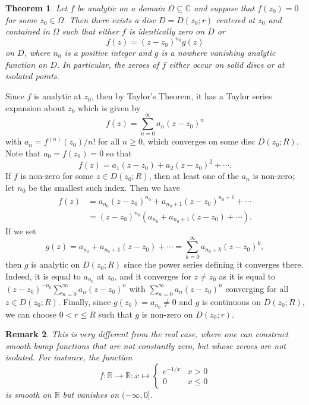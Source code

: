 \documentclass[10pt]{article}
\makeatletter
\newcommand{\R}{\mathbb{R}}
\newcommand{\C}{\mathbb{C}}
\theoremstyle{newstyle}
\newtheorem{thm}{Theorem}[section]
\newtheorem{remark}[thm]{Remark}
\newenvironment{pf}[1][\proofname]{\par
  \pushQED{\qed}%
  \normalfont \topsep0\p@\relax
  \trivlist
  \item[\hskip\labelsep\scshape
  #1\@addpunct{.}]\ignorespaces
}{%
  \popQED\endtrivlist\@endpefalse
}
\makeatother
\begin{document}
\begin{thm}
Let $f$ be analytic on a domain $\Omega \subseteq \C$ and suppose that $f(z_0) = 0$ for some 
$z_0 \in \Omega$. Then there exists a disc $D = D(z_0; r)$ centered at $z_0$ and 
contained in $\Omega$ such that either $f$ is identically zero on $D$ or 
\[ f(z) = (z-z_0)^{n_0}g(z) \]
on $D$, where $n_0$ is a positive integer and $g$ is a nowhere vanishing analytic function on $D$. 
In particular, the zeroes of $f$ either occur on solid discs or at isolated points. 
\end{thm}
\begin{pf}
Since $f$ is analytic at $z_0$, then by Taylor's Theorem,
it has a Taylor series expansion about $z_0$ which is given by 
\[ f(z) = \sum_{n=0}^\infty a_n(z-z_0)^n \]
with $a_n = f^{(n)}(z_0)/n!$ for all $n \geq 0$, which converges on some disc $D(z_0; R)$. 
Note that $a_0 = f(z_0) = 0$ so that 
\[ f(z) = a_1(z-z_0) + a_2(z-z_0)^2 + \cdots. \]
If $f$ is non-zero for some $z \in D(z_0; R)$, then at least one of the $a_n$ is non-zero; 
let $n_0$ be the smallest such index. Then we have
\begin{align*}
    f(z) &= a_{n_0}(z-z_0)^{n_0} + a_{n_0+1}(z-z_0)^{n_0+1} + \cdots \\
    &= (z-z_0)^{n_0} (a_{n_0} + a_{n_0+1}(z-z_0) + \cdots). 
\end{align*}
If we set 
\[ g(z) = a_{n_0} + a_{n_0+1}(z-z_0) + \cdots = \sum_{k=0}^\infty a_{n_0+k}(z-z_0)^k, \]
then $g$ is analytic on $D(z_0; R)$ since the power series defining it converges there. 
Indeed, it is equal to $a_{n_0}$ at $z_0$, and it converges for $z \neq z_0$ as it is equal to 
$(z-z_0)^{-n_0} \sum_{n=0}^\infty a_n(z-z_0)^n$ with $\sum_{n=0}^\infty a_n(z-z_0)^n$ converging 
for all $z \in D(z_0; R)$. Finally, since $g(z_0) = a_{n_0} \neq 0$ and $g$ is 
continuous on $D(z_0; R)$, we can choose $0 < r \leq R$ such that 
$g$ is non-zero on $D(z_0; r)$. 
\end{pf}

\begin{remark}
This is very different from the real case, where one can construct smooth bump functions 
that are not constantly zero, but whose zeroes are not isolated. For instance, the function 
\[ f : \R \to \R : x \mapsto \begin{cases} e^{-1/x} & x>0 \\ 0 & x \leq 0 \end{cases} \]
is smooth on $\R$ but vanishes on $(-\infty, 0]$. 
\end{remark}
\end{document}
